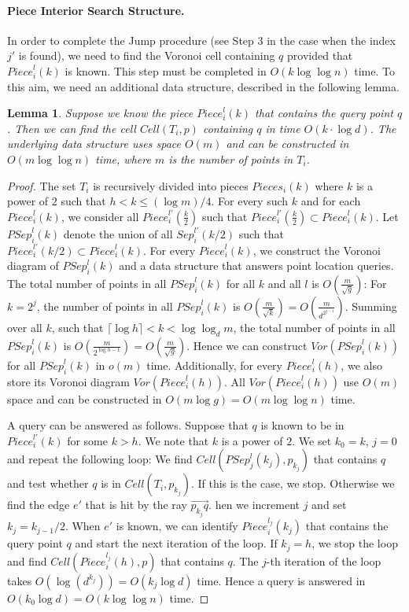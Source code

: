 \documentclass[12pt,a4paper,USenglish,cleveref, autoref, thm-restate]{article}
\newcommand{\ovar}[1]{\overrightarrow{#1}}
\newcommand{\Cell}{\mathit{Cell}}
\newcommand{\Piece}{\mathit{Piece}}
\newcommand{\Sep}{\mathit{Sep}}
\newcommand{\PSep}{\mathit{PSep}}
\newcommand{\Voron}{\mathit{Vor}}
\newtheorem{lemma}{Lemma}
\newcommand{\ovar}[1]{\overrightarrow{#1}}
\newcommand{\Cell}{\mathit{Cell}}
\newcommand{\Piece}{\mathit{Piece}}
\newcommand{\Sep}{\mathit{Sep}}
\newcommand{\PSep}{\mathit{PSep}}
\newcommand{\Voron}{\mathit{Vor}}
\newcommand{\ovar}[1]{\overrightarrow{#1}}
\newcommand{\Cell}{\mathit{Cell}}
\newcommand{\Piece}{\mathit{Piece}}
\newcommand{\Sep}{\mathit{Sep}}
\newcommand{\PSep}{\mathit{PSep}}
\newcommand{\Voron}{\mathit{Vor}}
\begin{document}
\paragraph*{Piece Interior Search Structure.}
In order to complete the Jump procedure (see Step 3 in the case when the index $j'$ is found), we need to find the Voronoi cell containing $q$ provided that $\Piece^l_i(k)$ is known. This step must be completed in $O(k\log \log n)$ time. To this aim, we need an additional data structure, described in  the following lemma.
\begin{lemma}
  \label{lemma:pl-regions}
Suppose we know the piece  $\Piece^l_i(k)$  that contains the query point $q$.
Then we can find the cell $\Cell(T_i,p)$ containing  $q$ in time $O(k\cdot \log d)$. The underlying data structure uses space $O(m)$  and can be constructed in $O(m\log\log n)$ time, where $m$ is the number of points in $T_i$.
\end{lemma}
\begin{proof}
  The set $T_i$ is recursively divided into pieces $Pieces_i(k)$  where $k$ is a power of $2$ such that  $h< k  \le (\log m)/4$. 
For every such $k$ and for each $\Piece^l_i(k)$, we consider all $\Piece^{l'}_i(\frac{k}{2})$ such that $\Piece^{l'}_i(\frac{k}{2})\subset \Piece^l_i(k)$.  Let $\PSep^l_i(k)$ denote the union of all $\Sep^{l'}_i(k/2)$ such that $\Piece^{l'}_i(k/2)\subset \Piece^l_i(k)$.
For every $\Piece^l_i(k)$, we construct the Voronoi diagram of $\PSep_i^l(k)$ and a data structure that answers point location queries. The total number of points in all $P\Sep^l_i(k)$ for all $k$ and all $l$ is $O(\frac{m}{\sqrt{g}})$: For $k=2^j$, the number of points in all $P\Sep^l_i(k)$ is $O(\frac{m}{\sqrt{k}})=O(\frac{m}{d^{2^{j-1}}})$. Summing over all $k$, such that $\lceil\log h\rceil <  k < \log\log_d m$, the total number of points in all $P\Sep^l_i(k)$ is $O(\frac{m}{2^{\log h-1}})=O(\frac{m}{\sqrt{g}})$.   Hence we can construct $\Voron(\PSep^l_i(k))$ for all $\PSep^l_i(k)$ in $o(m)$ time.
Additionally, for every $\Piece^l_i(h)$, we also store its Voronoi diagram $\Voron(\Piece_i^l(h))$.  All $\Voron(\Piece_i^l(h))$ use $O(m)$ space and can be constructed in $O(m \log g)=O(m\log\log n)$ time.  

A query can be answered as follows. Suppose that $q$ is known to be in $\Piece^{l'}_i(k)$ for some $k>h$. We note that $k$ is a power of $2$.
We set $k_0=k$, $j=0$ and repeat the following loop:
We find $\Cell(\PSep^l_j(k_j),p_{k_j})$ that contains $q$ and test whether $q$ is in $\Cell(T_i,p_{k_j})$. If this is the case, we stop. Otherwise we  find the edge $e'$ that is hit by the ray $\ovar{p_{k_j}q}$.  hen we increment $j$ and  set $k_j=k_{j-1}/2$. When $e'$ is known, we can identify 
$\Piece^{l_j}_i(k_{j})$ that contains the query point $q$ and start the next iteration of the loop.
If  $k_j=h$, we stop the loop and find $\Cell(\Piece^{l_j}_i(h), p)$ that contains $q$. The $j$-th iteration of the loop takes $O(\log(d^{k_j}))=O(k_j\log d)$ time. Hence a query is answered in $O(k_0\log d)=O(k\log \log n)$ time.
\end{proof}
\end{document}
